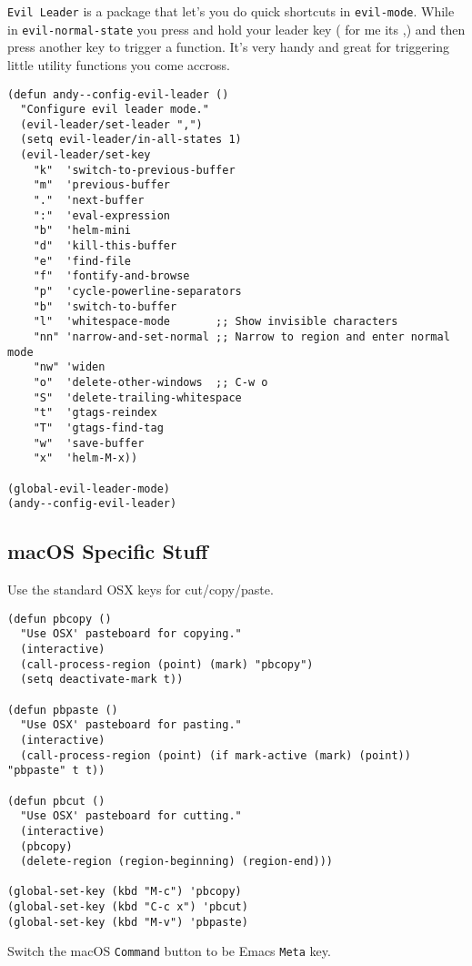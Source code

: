 \documentclass{article}
\begin{document}
\texttt{Evil Leader} is a package that let's you do quick shortcuts in \texttt{evil-mode}. While in \texttt{evil-normal-state} you press and hold your leader key ( for me its ,) and then press another key to trigger a function. It's very handy and great for triggering little utility functions you come accross.

\begin{verbatim}
(defun andy--config-evil-leader ()
  "Configure evil leader mode."
  (evil-leader/set-leader ",")
  (setq evil-leader/in-all-states 1)
  (evil-leader/set-key
    "k"  'switch-to-previous-buffer
    "m"  'previous-buffer
    "."  'next-buffer
    ":"  'eval-expression
    "b"  'helm-mini
    "d"  'kill-this-buffer
    "e"  'find-file
    "f"  'fontify-and-browse
    "p"  'cycle-powerline-separators
    "b"  'switch-to-buffer
    "l"  'whitespace-mode       ;; Show invisible characters
    "nn" 'narrow-and-set-normal ;; Narrow to region and enter normal mode
    "nw" 'widen
    "o"  'delete-other-windows  ;; C-w o
    "S"  'delete-trailing-whitespace
    "t"  'gtags-reindex
    "T"  'gtags-find-tag
    "w"  'save-buffer
    "x"  'helm-M-x))

(global-evil-leader-mode)
(andy--config-evil-leader)
\end{verbatim}

\subsection{macOS Specific Stuff}
\label{sec-7-5}

Use the standard OSX keys for cut/copy/paste.

\begin{verbatim}
(defun pbcopy ()
  "Use OSX' pasteboard for copying."
  (interactive)
  (call-process-region (point) (mark) "pbcopy")
  (setq deactivate-mark t))

(defun pbpaste ()
  "Use OSX' pasteboard for pasting."
  (interactive)
  (call-process-region (point) (if mark-active (mark) (point)) "pbpaste" t t))

(defun pbcut ()
  "Use OSX' pasteboard for cutting."
  (interactive)
  (pbcopy)
  (delete-region (region-beginning) (region-end)))

(global-set-key (kbd "M-c") 'pbcopy)
(global-set-key (kbd "C-c x") 'pbcut)
(global-set-key (kbd "M-v") 'pbpaste)
\end{verbatim}

Switch the macOS \texttt{Command} button to be Emacs \texttt{Meta} key.
\end{document}
